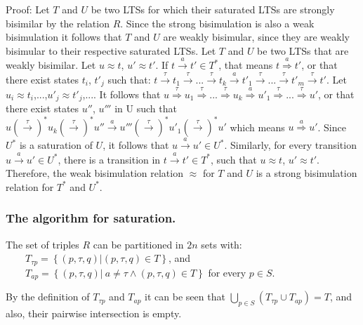 Proof: Let $T$ and $U$ be two LTSs for which their saturated LTSs are strongly bisimilar by the relation $R$. Since the strong bisimulation is also a weak bisimulation it follows that $T$ and $U$ are weakly bisimular, since they are weakly bisimular to their respective saturated LTSs.
Let $T$ and $U$ be two LTSs that are weakly bisimilar. Let $u\approx t$, $u'\approx t'$. If $t\stackrel{a}{\rightarrow}t'\in T^{*}$, that means $t\stackrel{a}{\Rightarrow}t'$, or that there exist states $t_{i}$, $t'_{j}$ such that: $t\stackrel{\tau}{\rightarrow}t_{1}\stackrel{\tau}{\rightarrow}...\stackrel{\tau}{\rightarrow}t_{k}\stackrel{a}{\rightarrow}t'_{1}\stackrel{\tau}{\rightarrow}...\stackrel{\tau}{\rightarrow}t'_{m}\stackrel{\tau}{\rightarrow}t'$. Let $u_{i}\approx t_{i}$,...,$u'_{j}\approx t'_{j}$,.... It follows that $u\stackrel{\tau}{\Rightarrow}u_{1}\stackrel{\tau}{\Rightarrow}...\stackrel{\tau}{\Rightarrow}u_{k}\stackrel{a}{\Rightarrow}u'_{1}\stackrel{\tau}{\Rightarrow}...\stackrel{\tau}{\Rightarrow}u'$, or that there exist states $u''$, $u'''$ in U such that $u\left(\stackrel{\tau}{\rightarrow}\right)^{*}u_{k}\left(\stackrel{\tau}{\rightarrow}\right)^{*}u''\stackrel{a}{\rightarrow}u'''\left(\stackrel{\tau}{\rightarrow}\right)^{*}u'_{1}\left(\stackrel{\tau}{\rightarrow}\right)^{*}u'$ which means $u\stackrel{a}{\Rightarrow}u'$. Since $U^{*}$ is a saturation of $U$, it follows that $u\stackrel{a}{\rightarrow}u'\in U^{*}$.
Similarly, for every transition $u\stackrel{a}{\rightarrow}u'\in U^{*}$, there is a transition in $t\stackrel{a}{\rightarrow}t'\in T^{*}$, such that $u\approx t$, $u'\approx t'$.
Therefore, the weak bisimulation relation $\approx$ for $T$ and $U$ is a strong bisimulation relation for $T^{*}$ and $U^{*}$.

\subsubsection{The algorithm for saturation.}

The set of triples ${R}$ can be partitioned in ${2n}$ sets with: \\
\ \ \ \ ${T_{\tau p}=\left\{\left(p,\tau,q\right)| \left(p,\tau,q\right)\in T\right\}}$, and\\
\ \ \ \ ${T_{ap}=\left\{\left(p,\tau,q\right)|\ a\neq\tau\wedge\left(p,\tau,q\right)\in T\right\}}$ for every ${p\in S}$.

By the definition of ${T_{\tau p}}$ and ${T_{ap}}$ it can be seen that ${\bigcup_{p\in S}\left(T_{\tau p}\cup T_{ap}\right)=T}$, and also, their pairwise intersection is empty. 

